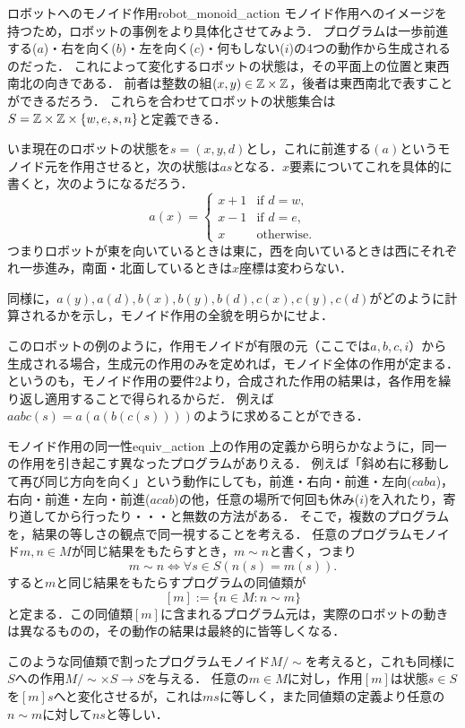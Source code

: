 \documentclass[11pt,a4paper, dvipdfmx]{jsarticle}
\begin{document}
\begin{rei}{ロボットへのモノイド作用}{robot_monoid_action}
    モノイド作用へのイメージを持つため，ロボットの事例をより具体化させてみよう．
    プログラムは一歩前進する($a$)・右を向く($b$)・左を向く($c$)・何もしない($i$)の4つの動作から生成されるのだった．
    これによって変化するロボットの状態は，その平面上の位置と東西南北の向きである．
    前者は整数の組$(x, y) \in \mathbb{Z} \times \mathbb{Z}$，後者は東西南北で表すことができるだろう．
    これらを合わせてロボットの状態集合は$S = \mathbb{Z} \times \mathbb{Z} \times \{w, e, s, n\}$と定義できる．
    
    いま現在のロボットの状態を$s = (x, y, d)$とし，これに前進する$(a)$というモノイド元を作用させると，次の状態は$as$となる．$x$要素についてこれを具体的に書くと，次のようになるだろう．
    \[
    a(x) = \begin{cases}
        x + 1 & \text{if } d=w, \\
        x - 1 & \text{if } d=e, \\
        x & \text{otherwise}.
    \end{cases}
    \]
    つまりロボットが東を向いているときは東に，西を向いているときは西にそれぞれ一歩進み，南面・北面しているときは$x$座標は変わらない．
\end{rei}

\begin{renshu}{}{}
    同様に，$a(y), a(d), b(x), b(y), b(d), c(x), c(y), c(d)$がどのように計算されるかを示し，モノイド作用の全貌を明らかにせよ．
\end{renshu}

このロボットの例のように，作用モノイドが有限の元（ここでは$a, b, c, i$）から生成される場合，生成元の作用のみを定めれば，モノイド全体の作用が定まる．
というのも，モノイド作用の要件2より，合成された作用の結果は，各作用を繰り返し適用することで得られるからだ．
例えば$aabc(s) = a(a(b(c(s))))$のように求めることができる．


\begin{hatten}{モノイド作用の同一性}{equiv_action}
    上の作用の定義から明らかなように，同一の作用を引き起こす異なったプログラムがありえる．
    例えば「斜め右に移動して再び同じ方向を向く」という動作にしても，前進・右向・前進・左向($caba$)，右向・前進・左向・前進($acab$)の他，任意の場所で何回も休み($i$)を入れたり，寄り道してから行ったり・・・と無数の方法がある．
    そこで，複数のプログラムを，結果の等しさの観点で同一視することを考える．
    任意のプログラムモノイド$m,n \in M$が同じ結果をもたらすとき，$m \sim n$と書く，つまり
    \[ m \sim n  \iff \forall s \in S (n(s) = m(s)). \]
    すると$m$と同じ結果をもたらすプログラムの同値類が
    \[ [m] := \{n \in M: n \sim m \} \]
    と定まる．この同値類$[m]$に含まれるプログラム元は，実際のロボットの動きは異なるものの，その動作の結果は最終的に皆等しくなる．

    このような同値類で割ったプログラムモノイド$M/\sim$を考えると，これも同様に$S$への作用$M/\sim \times S \to S$を与える．
    任意の$m \in M$に対し，作用$[m]$は状態$s \in S$を$[m]s$へと変化させるが，これは$ms$に等しく，また同値類の定義より任意の$n \sim m$に対して$ns$と等しい．
\end{hatten}
\end{document}
